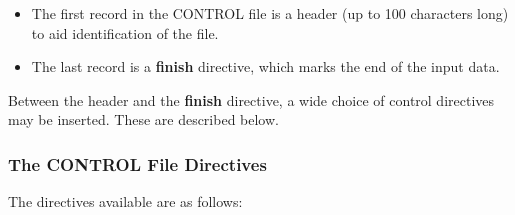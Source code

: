 \begin{itemize}
\item The first record in the CONTROL file is a header (up to 100
characters long) to aid identification of the file.
\item The last record is a {\bf finish} directive, which marks
the end of the input data.
\end{itemize}

Between the header and the {\bf finish} directive, a wide choice
of control directives may be inserted.  These are described below.

\subsubsection{The CONTROL File Directives}

The directives available are as follows:

